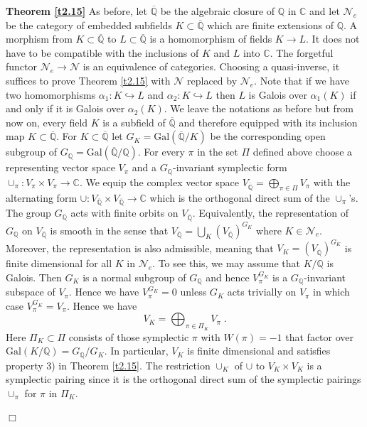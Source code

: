 \documentclass[12pt,leqno]{article}
\newcommand{\C}{{\mathbb{C}}}
\newcommand{\Q}{{\mathbb{Q}}}
\newcommand{\oQ}{\overline{\Q}}
\newcommand{\Gal}{\mathrm{Gal}}
\newcommand{\Nh}{{\mathcal N}}
\newenvironment{proofof}{\noindent {\bf Proof of}}{\mbox{}\hspace*{\fill}$\Box$}
\begin{document}
\begin{proofof} \textbf{Theorem \ref{t2.15}} 
As before, let $\oQ$ be the algebraic closure of $\Q$ in $\C$ and let $\Nh_e$ be the category of embedded subfields $K \subset \oQ$ which are finite extensions of $\Q$. A morphism from $K \subset \oQ$ to $L \subset \oQ$ is a homomorphism of fields $K \to L$. It does not have to be compatible with the inclusions of $K$ and $L$ into $\C$. The forgetful functor $\Nh_e \to \Nh$ is an equivalence of categories. Choosing a quasi-inverse, it suffices to prove Theorem \ref{t2.15} with $\Nh$ replaced by $\Nh_e$. Note that if we have two homomorphisms $\alpha_1 : K \hookrightarrow L$ and $\alpha_2 : K \hookrightarrow L$ then $L$ is Galois over $\alpha_1 (K)$ if and only if it is Galois over $\alpha_2 (K)$. We leave the notations as before but from now on, every field $K$ is a subfield of $\oQ$ and therefore equipped with its inclusion map $K \subset \oQ$. For $K \subset \oQ$ let $G_K = \Gal (\oQ / K)$ be the corresponding open subgroup of $G_{\Q} = \Gal (\oQ / \Q)$. For every $\pi$ in the set $\Pi$ defined above choose a representing vector space $V_{\pi}$ and a $G_{\Q}$-invariant symplectic form $\cup_{\pi} : V_{\pi} \times V_{\pi} \to \C$. We equip the complex vector space $V_{\oQ} = \bigoplus_{\pi \in \Pi} V_{\pi}$ with the alternating form $\cup : V_{\oQ} \times V_{\oQ} \to \C$ which is the orthogonal direct sum of the $\cup_{\pi}$'s. The group $G_{\Q}$ acts with finite orbits on $V_{\oQ}$. Equivalently, the representation of $G_{\Q}$ on $V_{\oQ}$ is smooth in the sense that $V_{\oQ} = \bigcup_{K} (V_{\oQ})^{G_K}$ where $K \in \Nh_e$. Moreover, the representation is also admissible, meaning that $V_K = (V_{\oQ})^{G_K}$ is finite dimensional for all $K$ in $\Nh_e$. To see this, we may assume that $K / \Q$ is Galois. Then $G_K$ is a normal subgroup of $G_{\Q}$ and hence $V^{G_K}_{\pi}$ is a $G_{\Q}$-invariant subspace of $V_{\pi}$. Hence we have $V^{G_K}_{\pi} = 0$ unless $G_K$ acts trivially on $V_{\pi}$ in which case $V^{G_K}_{\pi} = V_{\pi}$. Hence we have
\begin{equation}
\label{eq:11}
V_K = \bigoplus_{ \pi \in \Pi_K} V_{\pi} \; .
\end{equation}
Here $\Pi_K \subset \Pi$ consists of those symplectic $\pi$ with $W (\pi) = -1$ that factor over $\Gal (K / \Q) = G_{\Q} / G_K$. In particular, $V_K$ is finite dimensional and satisfies property 3) in Theorem \ref{t2.15}. The restriction $\cup_K$ of $\cup$ to $V_K \times V_K$ is a symplectic pairing since it is the orthogonal direct sum of the symplectic pairings $\cup_{\pi}$ for $\pi$ in $\Pi_K$. 


\end{proofof}
\end{document}
